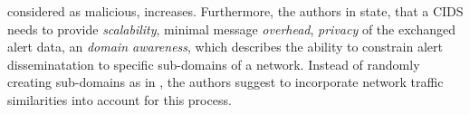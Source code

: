 \documentclass[../../main.tex]{subfiles}
\begin{document}
considered as malicious, increases. Furthermore, the authors in \cite{Vasilomanolakis2015SkipMon} state, that a CIDS needs to provide \textit{scalability}, minimal message \textit{overhead}, \textit{privacy} of the exchanged alert data, an \textit{domain awareness}, which describes the ability to constrain alert disseminatation to specific sub-domains of a network. Instead of randomly creating sub-domains as in \cite{Locasto2005}, the authors suggest to incorporate network traffic similarities into account for this process. 








\end{document}
